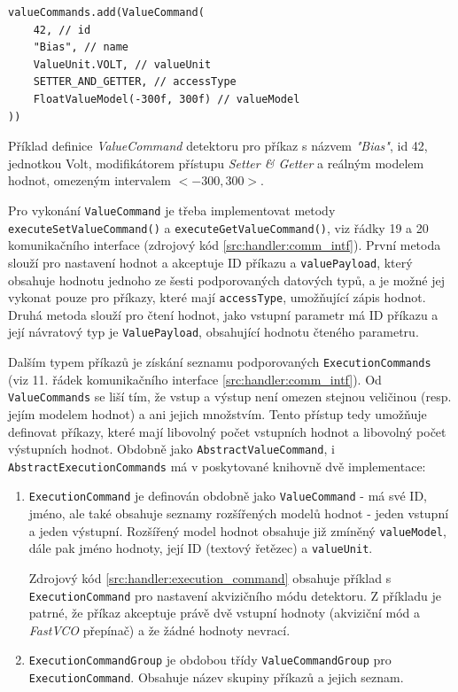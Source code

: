 \begin{code}[h!]
\begin{verbatim}
valueCommands.add(ValueCommand(
    42, // id
    "Bias", // name
    ValueUnit.VOLT, // valueUnit
    SETTER_AND_GETTER, // accessType
    FloatValueModel(-300f, 300f) // valueModel
))
\end{verbatim}
\caption{Příklad definice \textit{ValueCommand} detektoru pro příkaz s názvem \textit{"Bias"}, id 42, jednotkou Volt, modifikátorem přístupu \textit{Setter \& Getter} a reálným modelem hodnot, omezeným intervalem $<-300,300>$.}
\label{src:handler:value_command}
\end{code}

Pro vykonání \texttt{ValueCommand} je třeba implementovat metody \texttt{executeSetValueCommand()} a \texttt{executeGetValueCommand()}, viz řádky 19 a 20 komunikačního interface (zdrojový kód \ref{src:handler:comm_intf}). První metoda slouží pro nastavení hodnot a akceptuje ID příkazu a \texttt{valuePayload}, který obsahuje hodnotu jednoho ze šesti podporovaných datových typů, a je možné jej vykonat pouze pro příkazy, které mají \texttt{accessType}, umožňující zápis hodnot. Druhá metoda slouží pro čtení hodnot, jako vstupní parametr má ID příkazu a její návratový typ je \texttt{ValuePayload}, obsahující hodnotu čteného parametru.

Dalším typem příkazů je získání seznamu podporovaných \texttt{ExecutionCommands} (viz 11. řádek komunikačního interface \ref{src:handler:comm_intf}). Od \texttt{ValueCommands} se liší tím, že vstup a výstup není omezen stejnou veličinou (resp. jejím modelem hodnot) a ani jejich množstvím. Tento přístup tedy umožňuje definovat příkazy, které mají libovolný počet vstupních hodnot a libovolný počet výstupních hodnot. Obdobně jako \texttt{AbstractValueCommand}, i \texttt{AbstractExecutionCommands} má v poskytované knihovně dvě implementace:
\begin{enumerate}[label=(\roman*)]
	\item \texttt{ExecutionCommand} je definován obdobně jako \texttt{ValueCommand} - má své ID, jméno, ale také obsahuje seznamy rozšířených modelů hodnot - jeden vstupní a jeden výstupní. Rozšířený model hodnot obsahuje již zmíněný \texttt{valueModel}, dále pak jméno hodnoty, její ID (textový řetězec) a \texttt{valueUnit}.
	
	Zdrojový kód \ref{src:handler:execution_command} obsahuje příklad s \texttt{ExecutionCommand} pro nastavení akvizičního módu detektoru. Z příkladu je patrné, že příkaz akceptuje právě dvě vstupní hodnoty (akviziční mód a \textit{FastVCO} přepínač) a že žádné hodnoty nevrací.
	
	\item \texttt{ExecutionCommandGroup} je obdobou třídy \texttt{ValueCommandGroup} pro \texttt{ExecutionCommand}. Obsahuje název skupiny příkazů a jejich seznam.
\end{enumerate}

